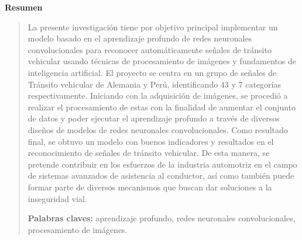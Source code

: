   \newpage
  \begin{center}
   {\bf\LARGE Resumen}
  \end{center} 
  \vskip 0.5cm
  \begin{quotation}
  
  La presente investigación tiene por objetivo principal implementar un modelo basado en el aprendizaje profundo de redes neuronales convolucionales para reconocer automáticamente señales de tránsito vehicular usando técnicas de procesamiento de imágenes y fundamentos de inteligencia artificial.
  \vskip 0.2cm
  El proyecto se centra en un grupo de señales de Tránsito vehicular de Alemania y Perú, identificando 43 y 7 categorías respectivamente. Iniciando con  la adquisición de imágenes, se procedió a realizar el procesamiento de estas con la finalidad de aumentar el conjunto de datos y poder ejecutar el aprendizaje profundo a través de diversos diseños de modelos de redes neuronales convolucionales.
  \vskip 0.2cm
  Como resultado final, se obtuvo un modelo con buenos indicadores y resultados en el reconocimiento de señales de tránsito vehicular. De esta manera, se pretende contribuir en los esfuerzos de la industria automotriz en el campo de sistemas avanzados de asistencia al conductor, así como también puede formar parte de diversos mecanismos que buscan dar soluciones a la inseguridad vial.

  \vskip 0.2cm
  {\bf Palabras claves:} aprendizaje profundo, redes neuronales convolucionales, procesamiento de imágenes.
  \end{quotation}


